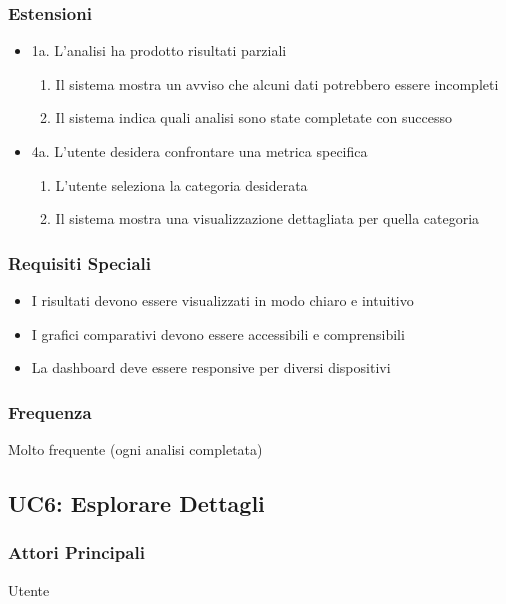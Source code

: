 \subsubsection{Estensioni}
\begin{itemize}
    \item 1a. L'analisi ha prodotto risultati parziali
    \begin{enumerate}
        \item Il sistema mostra un avviso che alcuni dati potrebbero essere incompleti
        \item Il sistema indica quali analisi sono state completate con successo
    \end{enumerate}
    
    \item 4a. L'utente desidera confrontare una metrica specifica
    \begin{enumerate}
        \item L'utente seleziona la categoria desiderata
        \item Il sistema mostra una visualizzazione dettagliata per quella categoria
    \end{enumerate}
\end{itemize}

\subsubsection{Requisiti Speciali}
\begin{itemize}
    \item I risultati devono essere visualizzati in modo chiaro e intuitivo
    \item I grafici comparativi devono essere accessibili e comprensibili
    \item La dashboard deve essere responsive per diversi dispositivi
\end{itemize}

\subsubsection{Frequenza}
Molto frequente (ogni analisi completata)

\subsection{UC6: Esplorare Dettagli}

\subsubsection{Attori Principali}
Utente

